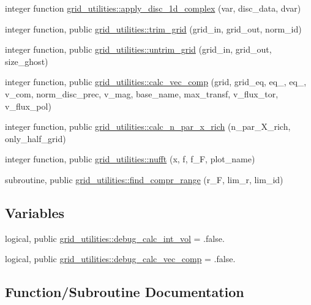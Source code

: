 \begin{DoxyCompactItemize}
integer function \hyperlink{namespacegrid__utilities_a948a0ef995a14a7a80464933e8c28029}{grid\+\_\+utilities\+::apply\+\_\+disc\+\_\+1d\+\_\+complex} (var, disc\+\_\+data, dvar)
\item 
integer function, public \hyperlink{namespacegrid__utilities_a67001ff9bbcad707aacf17f90a748d90}{grid\+\_\+utilities\+::trim\+\_\+grid} (grid\+\_\+in, grid\+\_\+out, norm\+\_\+id)
\item 
integer function, public \hyperlink{namespacegrid__utilities_a4679f24af8e02793070f4e27b43e00b6}{grid\+\_\+utilities\+::untrim\+\_\+grid} (grid\+\_\+in, grid\+\_\+out, size\+\_\+ghost)
\item 
integer function, public \hyperlink{namespacegrid__utilities_a3076796477d38ffed189868b3b28efb1}{grid\+\_\+utilities\+::calc\+\_\+vec\+\_\+comp} (grid, grid\+\_\+eq, eq\+\_, eq\+\_, v\+\_\+com, norm\+\_\+disc\+\_\+prec, v\+\_\+mag, base\+\_\+name, max\+\_\+transf, v\+\_\+flux\+\_\+tor, v\+\_\+flux\+\_\+pol)
\item 
integer function, public \hyperlink{namespacegrid__utilities_adeb8c22db4d419a278d6fcc68a34100c}{grid\+\_\+utilities\+::calc\+\_\+n\+\_\+par\+\_\+x\+\_\+rich} (n\+\_\+par\+\_\+\+X\+\_\+rich, only\+\_\+half\+\_\+grid)
\item 
integer function, public \hyperlink{namespacegrid__utilities_a0854b2d6cc61a31f68b4afe7304077a9}{grid\+\_\+utilities\+::nufft} (x, f, f\+\_\+F, plot\+\_\+name)
\item 
subroutine, public \hyperlink{namespacegrid__utilities_ae08e1ff213071c9d411a9b9c76035e1e}{grid\+\_\+utilities\+::find\+\_\+compr\+\_\+range} (r\+\_\+F, lim\+\_\+r, lim\+\_\+id)
\end{DoxyCompactItemize}
\subsection*{Variables}
\begin{DoxyCompactItemize}
\item 
logical, public \hyperlink{namespacegrid__utilities_a0743c0341d508034b14aee614fa4f8a9}{grid\+\_\+utilities\+::debug\+\_\+calc\+\_\+int\+\_\+vol} = .false.
\item 
logical, public \hyperlink{namespacegrid__utilities_ab420036236dc8a9a69e180550499d95b}{grid\+\_\+utilities\+::debug\+\_\+calc\+\_\+vec\+\_\+comp} = .false.
\end{DoxyCompactItemize}


\subsection{Function/\+Subroutine Documentation}
\mbox{\label{grid__utilities_8f90_ad39ac81f24bae991c679caf84a4ad757}} 
